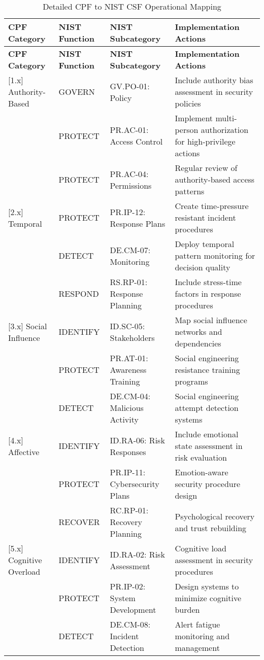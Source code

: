 \documentclass[11pt,a4paper]{article}
\begin{document}
\begin{longtable}{p{2.5cm}p{4cm}p{4cm}p{4.5cm}}
\caption{Detailed CPF to NIST CSF Operational Mapping} \label{tab:detailed-mapping} \\
\toprule
\textbf{CPF Category} & \textbf{NIST Function} & \textbf{NIST Subcategory} & \textbf{Implementation Actions} \\
\midrule
\endfirsthead
\toprule
\textbf{CPF Category} & \textbf{NIST Function} & \textbf{NIST Subcategory} & \textbf{Implementation Actions} \\
\midrule
\endhead
\bottomrule
\endfoot

[1.x] Authority-Based & GOVERN & GV.PO-01: Policy & Include authority bias assessment in security policies \\
 & PROTECT & PR.AC-01: Access Control & Implement multi-person authorization for high-privilege actions \\
 & PROTECT & PR.AC-04: Permissions & Regular review of authority-based access patterns \\

[2.x] Temporal & PROTECT & PR.IP-12: Response Plans & Create time-pressure resistant incident procedures \\
 & DETECT & DE.CM-07: Monitoring & Deploy temporal pattern monitoring for decision quality \\
 & RESPOND & RS.RP-01: Response Planning & Include stress-time factors in response procedures \\

[3.x] Social Influence & IDENTIFY & ID.SC-05: Stakeholders & Map social influence networks and dependencies \\
 & PROTECT & PR.AT-01: Awareness Training & Social engineering resistance training programs \\
 & DETECT & DE.CM-04: Malicious Activity & Social engineering attempt detection systems \\

[4.x] Affective & IDENTIFY & ID.RA-06: Risk Responses & Include emotional state assessment in risk evaluation \\
 & PROTECT & PR.IP-11: Cybersecurity Plans & Emotion-aware security procedure design \\
 & RECOVER & RC.RP-01: Recovery Planning & Psychological recovery and trust rebuilding \\

[5.x] Cognitive Overload & IDENTIFY & ID.RA-02: Risk Assessment & Cognitive load assessment in security procedures \\
 & PROTECT & PR.IP-02: System Development & Design systems to minimize cognitive burden \\
 & DETECT & DE.CM-08: Incident Detection & Alert fatigue monitoring and management \\


\end{longtable}
\end{document}
